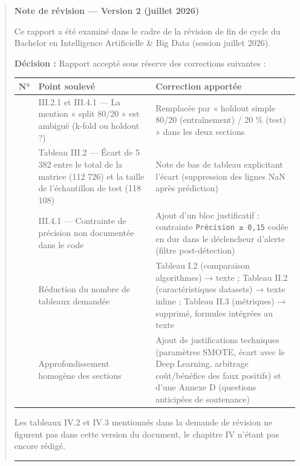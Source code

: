 \documentclass[
  12pt,
]{article}
\newcounter{none} %
\begin{document}
\begin{quote}
\textbf{Note de révision — Version 2 (juillet 2026)}

Ce rapport a été examiné dans le cadre de la révision de fin de cycle du
Bachelor en Intelligence Artificielle \& Big Data (session juillet
2026).

\textbf{Décision :} Rapport accepté sous réserve des corrections
suivantes :

{\def\LTcaptype{none} %
\begin{longtable}[]{@{}
  >{\raggedright\arraybackslash}p{}
  >{\raggedright\arraybackslash}p{}
  >{\raggedright\arraybackslash}p{}@{}}
\toprule\noalign{}
\begin{minipage}[b]{\linewidth}\raggedright
N°
\end{minipage} & \begin{minipage}[b]{\linewidth}\raggedright
Point soulevé
\end{minipage} & \begin{minipage}[b]{\linewidth}\raggedright
Correction apportée
\end{minipage} \\
\midrule\noalign{}
\endhead
\bottomrule\noalign{}
\endlastfoot
1 & III.2.1 et III.4.1 — La mention « split 80/20 » est ambiguë (k-fold
ou holdout ?) & Remplacée par « holdout simple 80/20 (entraînement) / 20
\% (test) » dans les deux sections \\
2 & Tableau III.2 — Écart de 5 382 entre le total de la matrice (112
726) et la taille de l’échantillon de test (118 108) & Note de bas de
tableau explicitant l’écart (suppression des lignes NaN après
prédiction) \\
3 & III.4.1 — Contrainte de précision non documentée dans le code &
Ajout d’un bloc justificatif : contrainte \texttt{Précision\ ≥\ 0,15}
codée en dur dans le déclencheur d’alerte (filtre post-détection) \\
4 & Réduction du nombre de tableaux demandée & Tableau I.2 (comparaison
algorithmes) → texte ; Tableau II.2 (caractéristiques datasets) → texte
inline ; Tableau II.3 (métriques) → supprimé, formules intégrées au
texte \\
5 & Approfondissement homogène des sections & Ajout de justifications
techniques (paramètres SMOTE, écart avec le Deep Learning, arbitrage
coût/bénéfice des faux positifs) et d’une Annexe D (questions anticipées
de soutenance) \\
\end{longtable}
}

Les tableaux IV.2 et IV.3 mentionnés dans la demande de révision ne
figurent pas dans cette version du document, le chapitre IV n’étant pas
encore rédigé.

\begin{center}\rule{0.5\linewidth}{0.5pt}\end{center}
\end{quote}
\end{document}
